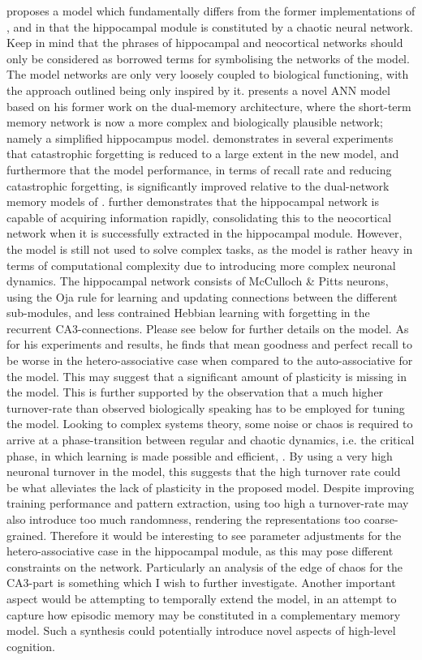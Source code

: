 \cite{Hattori2010} proposes a model which fundamentally differs from the former implementations of \cite{French1997, French2001}, and \cite{Ans1997} in that the hippocampal module is constituted by a chaotic neural network. Keep in mind that the phrases of hippocampal and neocortical networks should only be considered as borrowed terms for symbolising the networks of the model. The model networks are only very loosely coupled to biological functioning, with the approach outlined being only inspired by it.
\cite{Hattori2014} presents a novel ANN model based on his former work on the dual-memory architecture, where the short-term memory network is now a more complex and biologically plausible network; namely a simplified hippocampus model. \cite{Hattori2014} demonstrates in several experiments that catastrophic forgetting is reduced to a large extent in the new model, and furthermore that the model performance, in terms of recall rate and reducing catastrophic forgetting, is significantly improved relative to the dual-network memory models of \cite{Ans1997, French1997, Hattori2010}. \cite{Hattori2014} further demonstrates that the hippocampal network is capable of acquiring information rapidly, consolidating this to the neocortical network when it is successfully extracted in the hippocampal module.
However, the model is still not used to solve complex tasks, as the model is rather heavy in terms of computational complexity due to introducing more complex neuronal dynamics. The hippocampal network consists of McCulloch \& Pitts neurons, using the Oja rule for learning and updating connections between the different sub-modules, and less contrained Hebbian learning with forgetting in the recurrent CA3-connections. Please see below for further details on the model.
As for his experiments and results, he finds that mean goodness and perfect recall to be worse in the hetero-associative case when compared to the auto-associative for the model. This may suggest that a significant amount of plasticity is missing in the model. This is further supported by the observation that a much higher turnover-rate than observed biologically speaking has to be employed for tuning the model. Looking to complex systems theory, some noise or chaos is required to arrive at a phase-transition between regular and chaotic dynamics, i.e. the critical phase, in which learning is made possible and efficient, \cite{Langton1990, Newman2003}. By using a very high neuronal turnover in the model, this suggests that the high turnover rate could be what alleviates the lack of plasticity in the proposed model. Despite improving training performance and pattern extraction, using too high a turnover-rate may also introduce too much randomness, rendering the representations too coarse-grained. Therefore it would be interesting to see parameter adjustments for the hetero-associative case in the hippocampal module, as this may pose different constraints on the network. Particularly an analysis of the edge of chaos for the CA3-part is something which I wish to further investigate. Another important aspect would be attempting to temporally extend the model, in an attempt to capture how episodic memory may be constituted in a complementary memory model. Such a synthesis could potentially introduce novel aspects of high-level cognition.

